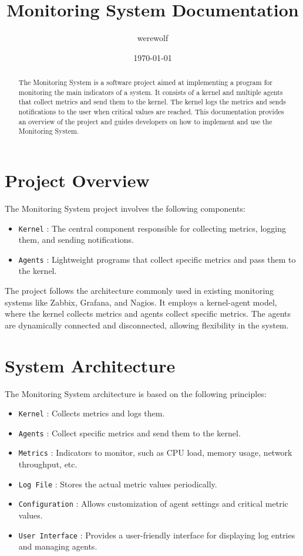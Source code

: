 \documentclass[12pt, letterpaper]{article}
\title{Monitoring System Documentation}
\author{werewolf}
\date{\today}
\begin{document}
\maketitle

\tableofcontents

\begin{abstract}
The Monitoring System is a software project aimed at implementing a program for monitoring the main indicators of a system. It consists of a kernel and multiple agents that collect metrics and send them to the kernel. The kernel logs the metrics and sends notifications to the user when critical values are reached. This documentation provides an overview of the project and guides developers on how to implement and use the Monitoring System.
\end{abstract}

\section{Project Overview}

The Monitoring System project involves the following components:
\begin{itemize}
    \item \texttt{Kernel} : The central component responsible for collecting metrics, logging them, and sending notifications.
    \item \texttt{Agents} : Lightweight programs that collect specific metrics and pass them to the kernel.
\end{itemize}

The project follows the architecture commonly used in existing monitoring systems like Zabbix, Grafana, and Nagios. It employs a kernel-agent model, where the kernel collects metrics and agents collect specific metrics. The agents are dynamically connected and disconnected, allowing flexibility in the system.

\section{System Architecture}

The Monitoring System architecture is based on the following principles:
\begin{itemize}
    \item \texttt{Kernel} : Collects metrics and logs them.
    \item \texttt{Agents} : Collect specific metrics and send them to the kernel.
    \item \texttt{Metrics} : Indicators to monitor, such as CPU load, memory usage, network throughput, etc.
    \item \texttt{Log File} : Stores the actual metric values periodically.
    \item \texttt{Configuration} : Allows customization of agent settings and critical metric values.
    \item \texttt{User Interface} : Provides a user-friendly interface for displaying log entries and managing agents.
\end{itemize}
\end{document}
